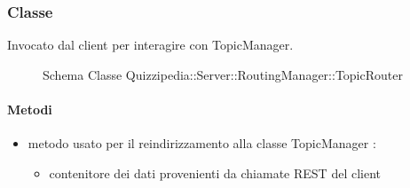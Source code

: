 \subsubsection{Classe }
Invocato dal client per interagire con TopicManager.
\begin{figure}[H]
\centering
\noindent{}
\caption[Schema Classe TopicRouter]{Schema Classe Quizzipedia::Server::RoutingManager::TopicRouter}
\end{figure}
\paragraph{Metodi}
\begin{itemize}
\item {}
\newline
metodo usato per il reindirizzamento alla classe TopicManager
\newline
{} :
\begin{itemize}
\item {}
\newline
contenitore dei dati provenienti da chiamate REST del client
\end{itemize}
\end{itemize}
